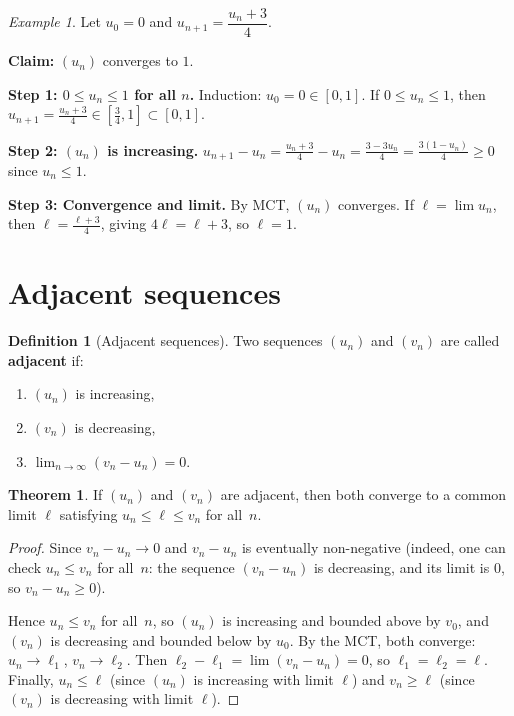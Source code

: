 \documentclass[12pt,a4paper,openany]{book}
\theoremstyle{definition}
\newtheorem{definition}{Definition}[chapter]
\newtheorem{theorem}{Theorem}[chapter]
\theoremstyle{remark}
\newtheorem{example}{Example}[chapter]
\begin{document}
\begin{example}\label{ex:recursive-contraction}
Let $u_0 = 0$ and $u_{n+1} = \dfrac{u_n + 3}{4}$.

\textbf{Claim:} $(u_n)$ converges to $1$.

\medskip\noindent
\textbf{Step 1: $0 \leq u_n \leq 1$ for all $n$.}
Induction: $u_0 = 0 \in [0,1]$.
If $0 \leq u_n \leq 1$, then $u_{n+1} = \frac{u_n+3}{4} \in
[\frac{3}{4}, 1] \subset [0,1]$.

\textbf{Step 2: $(u_n)$ is increasing.}
$u_{n+1} - u_n = \frac{u_n+3}{4} - u_n = \frac{3 - 3u_n}{4}
= \frac{3(1 - u_n)}{4} \geq 0$ since $u_n \leq 1$.

\textbf{Step 3: Convergence and limit.}
By MCT, $(u_n)$ converges. If $\ell = \lim u_n$, then
$\ell = \frac{\ell+3}{4}$, giving $4\ell = \ell + 3$, so $\ell = 1$.
\end{example}

\section{Adjacent sequences}\label{sec:adjacent}

\begin{definition}[Adjacent sequences]\label{def:adjacent}
Two sequences $(u_n)$ and $(v_n)$ are called \textbf{adjacent} if:
\begin{enumerate}
\item $(u_n)$ is increasing,
\item $(v_n)$ is decreasing,
\item $\lim_{n\to\infty}(v_n - u_n) = 0$.
\end{enumerate}
\end{definition}

\begin{theorem}\label{thm:adjacent}
If $(u_n)$ and $(v_n)$ are adjacent, then both converge to a common limit
$\ell$ satisfying $u_n \leq \ell \leq v_n$ for all~$n$.
\end{theorem}

\begin{proof}
Since $v_n - u_n \to 0$ and $v_n - u_n$ is eventually non-negative
(indeed, one can check $u_n \leq v_n$ for all~$n$: the sequence
$(v_n - u_n)$ is decreasing, and its limit is $0$, so $v_n - u_n \geq 0$).

Hence $u_n \leq v_n$ for all~$n$, so $(u_n)$ is increasing and bounded above
by $v_0$, and $(v_n)$ is decreasing and bounded below by $u_0$. By the MCT,
both converge: $u_n \to \ell_1$, $v_n \to \ell_2$. Then
$\ell_2 - \ell_1 = \lim(v_n - u_n) = 0$, so $\ell_1 = \ell_2 = \ell$.
Finally, $u_n \leq \ell$ (since $(u_n)$ is increasing with limit $\ell$)
and $v_n \geq \ell$ (since $(v_n)$ is decreasing with limit $\ell$).
\end{proof}
\end{document}
